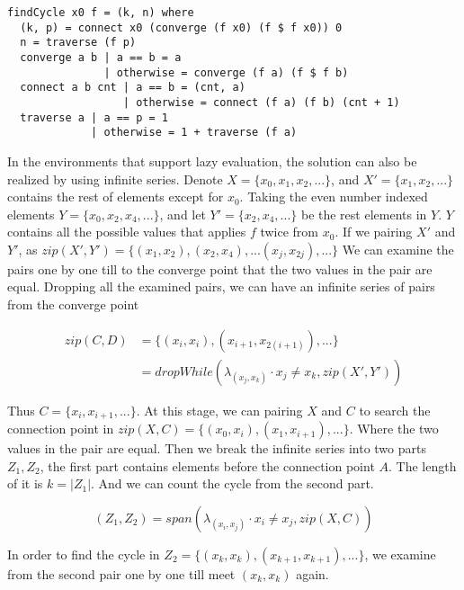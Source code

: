 \documentclass{article}
\begin{document}
\lstset{language=Haskell}
\begin{lstlisting}
findCycle x0 f = (k, n) where
  (k, p) = connect x0 (converge (f x0) (f $ f x0)) 0
  n = traverse (f p)
  converge a b | a == b = a
               | otherwise = converge (f a) (f $ f b)
  connect a b cnt | a == b = (cnt, a)
                  | otherwise = connect (f a) (f b) (cnt + 1)
  traverse a | a == p = 1
             | otherwise = 1 + traverse (f a)
\end{lstlisting}

In the environments that support lazy evaluation, the solution can also be realized by using infinite series.
Denote $X = \{x_0, x_1, x_2, ...\}$, and $X' = \{ x_1, x_2, ...\}$ contains the rest of elements except
for $x_0$. Taking the even number indexed elements $Y = \{x_0, x_2, x_4, ...\}$, and let $Y' = \{x_2, x_4, ...\}$
be the rest elements in $Y$. $Y$ contains all the possible values that applies $f$ twice from $x_0$.
If we pairing $X'$ and $Y'$, as $zip(X', Y') = \{(x_1, x_2), (x_2, x_4), ... (x_j, x_{2j}), ...\}$
We can examine the pairs one by one till to the converge point that the two values in the pair are equal.
Dropping all the examined pairs, we can have an infinite series of pairs from the converge point

\begin{equation}
\begin{array}{rl}
zip(C, D) & = \{(x_i, x_i), (x_{i+1}, x_{2(i+1)}), ...\} \\
  & = dropWhile(\lambda_{(x_j, x_k)} \cdot x_j \neq x_k, zip(X', Y'))
\end{array}
\end{equation}

Thus $C = \{x_i, x_{i+1}, ...\}$. At this stage, we can pairing $X$ and $C$ to search the connection point
in $zip(X, C) = \{(x_0, x_i), (x_1, x_{i+1}), ...\}$. Where the two values in the pair are equal. Then
we break the infinite series into two parts $Z_1, Z_2$, the first part contains elements before the
connection point $A$. The length of it is $k = |Z_1|$. And we can count the cycle from the second part.

\begin{equation}
(Z_1, Z_2) = span(\lambda_{(x_i, x_j)} \cdot x_i \neq x_j, zip(X, C))
\end{equation}

In order to find the cycle in $Z_2 = \{(x_k, x_k), (x_{k+1}, x_{k+1}), ...\}$, we examine from the second
pair one by one till meet $(x_k, x_k)$ again.
\end{document}

